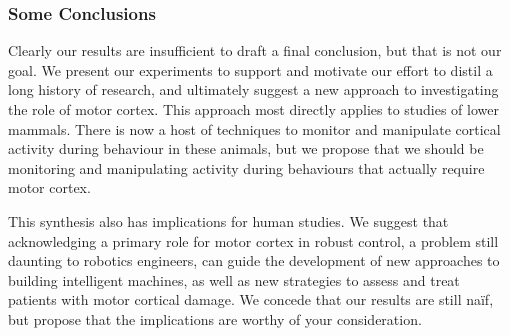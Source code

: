 \subsubsection*{Some Conclusions}

Clearly our results are insufficient to draft a final conclusion, but that is not our goal. We present our experiments to support and motivate our effort to distil a long history of research, and ultimately suggest a new approach to investigating the role of motor cortex. This approach most directly applies to studies of lower mammals. There is now a host of techniques to monitor and manipulate cortical activity during behaviour in these animals, but we propose that we should be monitoring and manipulating activity during behaviours that actually require motor cortex.

This synthesis also has implications for human studies. We suggest that acknowledging a primary role for motor cortex in robust control, a problem still daunting to robotics engineers, can guide the development of new approaches to building intelligent machines, as well as new strategies to assess and treat patients with motor cortical damage. We concede that our results are still naïf, but propose that the implications are worthy of your consideration.

